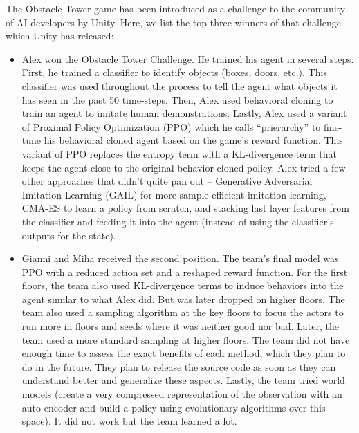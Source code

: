 \documentclass[conference]{IEEEtran}
\begin{document}
The Obstacle Tower game has been introduced as a challenge to the community of AI developers by Unity. Here, we list the top three winners of that challenge which Unity has released:
\begin{itemize}
\item Alex won the Obstacle Tower Challenge. He trained his agent in several steps. First, he trained a classifier to identify objects (boxes, doors, etc.). This classifier was used throughout the process to tell the agent what objects it has seen in the past 50 time-steps. Then, Alex used behavioral cloning to train an agent to imitate human demonstrations. Lastly, Alex used a variant of Proximal Policy Optimization (PPO) which he calls “prierarchy” to fine-tune his behavioral cloned agent based on the game’s reward function. This variant of PPO replaces the entropy term with a KL-divergence term that keeps the agent close to the original behavior cloned policy. Alex tried a few other approaches that didn’t quite pan out – Generative Adversarial Imitation Learning (GAIL) for more sample-efficient imitation learning, CMA-ES to learn a policy from scratch, and stacking last layer features from the classifier and feeding it into the agent (instead of using the classifier’s outputs for the state).
\item Gianni and Miha received the second position. The team’s final model was PPO with a reduced action set and a reshaped reward function. For the first floors, the team also used KL-divergence terms to induce behaviors into the agent similar to what Alex did. But was later dropped on higher floors. The team also used a sampling algorithm at the key floors to focus the actors to run more in floors and seeds where it was neither good nor bad. Later, the team used a more standard sampling at higher floors. The team did not have enough time to assess the exact benefits of each method, which they plan to do in the future. They plan to release the source code as soon as they can understand better and generalize these aspects. Lastly, the team tried world models (create a very compressed representation of the observation with an auto-encoder and build a policy using evolutionary algorithms over this space). It did not work but the team learned a lot.

\end{itemize}
\end{document}
